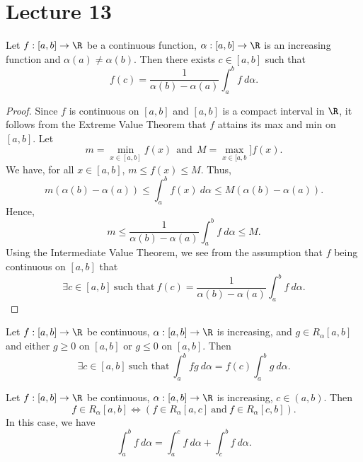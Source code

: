 \section{Lecture 13}

\begin{theorem}
    Let \( f:[a,b] \to \R  \) be a continuous function, \( \alpha:[a,b] \to \R  \) is an increasing function and \( \alpha(a) \neq \alpha(b) \). Then there exists \( c \in [a,b] \) such that 
    \[  f(c) = \frac{ 1 }{  \alpha(b) - \alpha(a) }   \int_{ a }^{ b }  f  \ d \alpha. \]
\end{theorem}
\begin{proof}
    Since \( f  \) is continuous on \( [a,b] \) and \( [a,b] \) is a compact interval in \( \R  \), it follows from the Extreme Value Theorem that \( f  \) attains its max and min on \( [a,b] \). Let 
    \[  m = \min_{x \in [a,b]} f(x) \ \ \text{and} \ \ M = \max_{x \in [a,b}] f(x). \]
    We have, for all \( x \in [a,b] \), \( m \leq f(x) \leq M  \). Thus, 
    \[  m(\alpha(b) - \alpha(a)) \leq \int_{ a }^{ b }  f(x) \ d \alpha \leq M(\alpha(b) - \alpha(a)).\]
    Hence, 
    \[  m \leq \frac{ 1 }{  \alpha(b) - \alpha(a)  }  \int_{ a }^{ b }  f  \ d \alpha \leq M.  \]
    Using the Intermediate Value Theorem, we see from the assumption that \( f  \) being continuous on \( [a,b]  \) that
    \[  \exists c \in [a,b] \ \text{such that} \ f(c) = \frac{ 1 }{ \alpha(b) - \alpha(a) } \int_{ a }^{ b }  f \ d \alpha. \]
\end{proof}

\begin{theorem}
    Let \( f:[a,b] \to \R  \) be continuous, \( \alpha:[a,b] \to \R  \) is increasing, and \( g \in {R}_{\alpha}[a,b]  \) and either \( g \geq 0  \) on \( [a,b] \) or \( g \leq 0  \) on \( [a,b] \). Then
    \[  \exists c \in [a,b] \ \text{such that} \ \int_{ a }^{ b }  fg  \ d \alpha = f(c) \int_{ a }^{ b }  g  \ d \alpha. \]
\end{theorem}

\begin{theorem}
    Let \( f:[a,b]  \to \R \) be continuous, \( \alpha:[a,b] \to \R  \) is increasing, \( c \in (a,b) \). Then
    \[  f \in {R}_{\alpha}[a,b] \iff (f \in {R}_{\alpha}[a,c] \ \text{and} \ f \in {R}_{\alpha}[c,b]). \]
    In this case, we have 
    \[  \int_{ a }^{ b }  f  \ d \alpha = \int_{ a }^{ c }  f  \ d \alpha + \int_{ c }^{ b  }  f \ d \alpha. \]
\end{theorem}

